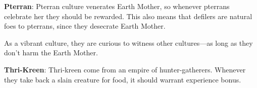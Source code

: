 \textbf{Pterran}: Pterran culture venerates Earth Mother, so whenever pterrans celebrate her they should be rewarded. This also means that defilers are natural foes to pterrans, since they desecrate Earth Mother.

As a vibrant culture, they are curious to witness other cultures---as long as they don't harm the Earth Mother.


\textbf{Thri-Kreen}: Thri-kreen come from an empire of hunter-gatherers. Whenever they take back a slain creature for food, it should warrant experience bonus.







